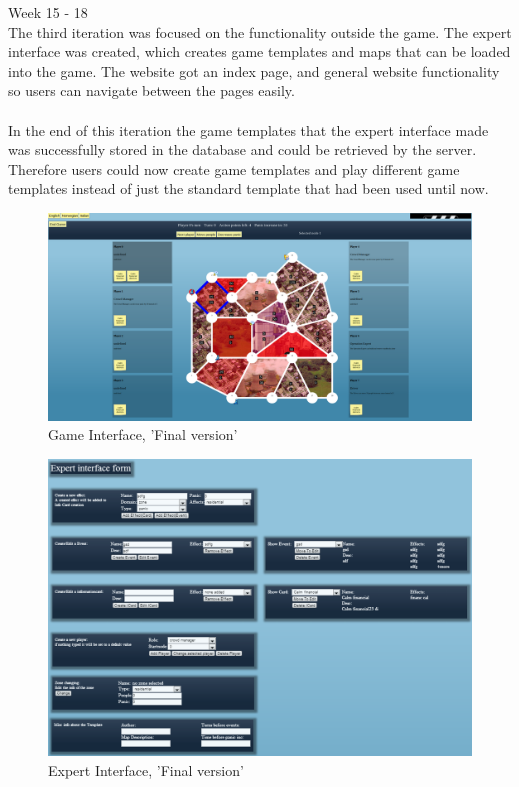 Week 15 - 18\\
\newline
The third iteration was focused on the functionality outside the game. The expert interface was created, which creates game templates and maps that can be loaded into the game. The website got an index page, and general website functionality so users can navigate between the pages easily.\\
\\
In the end of this iteration the game templates that the expert interface made was successfully stored in the database and could be retrieved by the server. Therefore users could now create game templates and play different game templates instead of just the standard template that had been used until now.\\
\begin{figure}[H]
  \centering
    \includegraphics[width=1.0\textwidth]{img/gamefinal.png}
  \caption{Game Interface, 'Final version'} 
  \label{fig:gamefinal}
\end{figure}

\begin{figure}[H]
  \centering
    \includegraphics[width=1.0\textwidth]{img/ExpertInterfaceForms.png}
  \caption{Expert Interface, 'Final version'} 
  \label{fig:EcpertInterfaceForm}
\end{figure}


